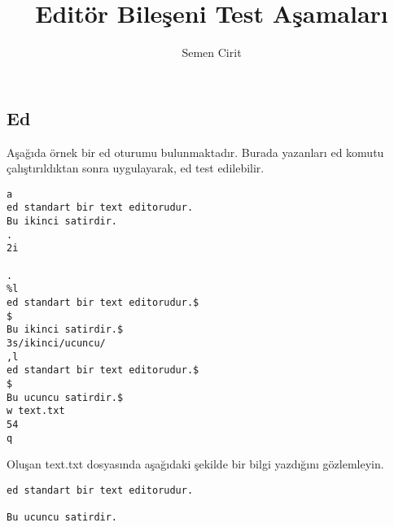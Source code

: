\documentclass[a4paper,10pt]{article}
\title{Editör Bileşeni Test Aşamaları}
\author{Semen Cirit}
\begin{document}
\maketitle

\subsection*{Ed}

Aşağıda örnek bir ed  oturumu bulunmaktadır. Burada yazanları ed komutu çalıştırıldıktan sonra uygulayarak, ed test edilebilir.

\begin{verbatim}
a
ed standart bir text editorudur.
Bu ikinci satirdir.
.
2i

.
%l
ed standart bir text editorudur.$
$
Bu ikinci satirdir.$
3s/ikinci/ucuncu/
,l
ed standart bir text editorudur.$
$
Bu ucuncu satirdir.$
w text.txt
54
q
\end{verbatim}
Oluşan text.txt dosyasında aşağıdaki şekilde bir bilgi yazdığını gözlemleyin.
\begin{verbatim}
ed standart bir text editorudur.

Bu ucuncu satirdir.
\end{verbatim}
\end{document}
